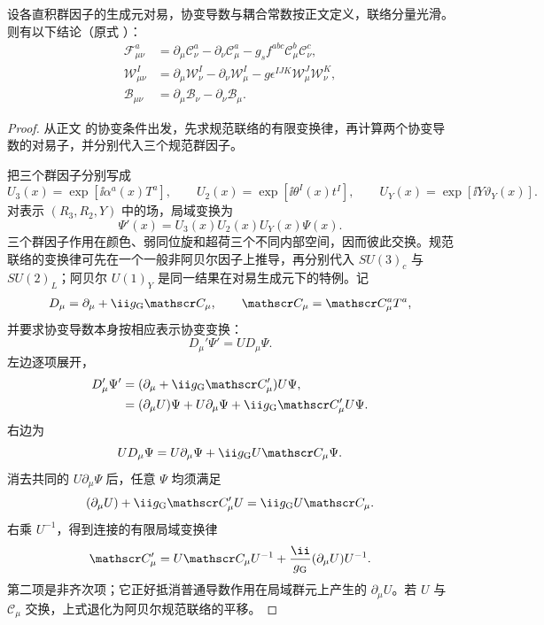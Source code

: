 \begin{proposition}[直积规范联络的曲率]
设各直积群因子的生成元对易，协变导数与耦合常数按正文定义，联络分量光滑。则有以下结论（原式 ）：
\begin{align*}
 \mathcal F_{\mu\nu}^a
 &=\partial_\mu\mathscr C_\nu^a-\partial_\nu\mathscr C_\mu^a
 -g_sf^{abc}\mathscr C_\mu^b\mathscr C_\nu^c,\\
 \mathcal W_{\mu\nu}^I
 &=\partial_\mu\mathcal W_\nu^I-\partial_\nu\mathcal W_\mu^I
 -g\epsilon^{IJK}\mathcal W_\mu^J\mathcal W_\nu^K,\\
 \mathcal B_{\mu\nu}
 &=\partial_\mu\mathcal B_\nu-\partial_\nu\mathcal B_\mu.
\end{align*}
\end{proposition}
\begin{proof}
从正文 的协变条件出发，先求规范联络的有限变换律，再计算两个协变导数的对易子，并分别代入三个规范群因子。

把三个群因子分别写成
\begin{equation*}
 U_3(x)=\exp[\ii\alpha^a(x)T^a],\qquad
 U_2(x)=\exp[\ii\theta^I(x)t^I],\qquad
 U_Y(x)=\exp[\ii Y\vartheta_Y(x)].
\end{equation*}
对表示 $(R_3,R_2,Y)$ 中的场，局域变换为
\begin{equation*}
 \Psi'(x)=U_3(x)U_2(x)U_Y(x)\Psi(x).
\end{equation*}
三个群因子作用在颜色、弱同位旋和超荷三个不同内部空间，因而彼此交换。规范联络的变换律可先在一个一般非阿贝尔因子上推导，再分别代入 $SU(3)_c$ 与 $SU(2)_L$；阿贝尔 $U(1)_Y$ 是同一结果在对易生成元下的特例。记
\begin{equation*}
 D_\mu=\partial_\mu+\ii g_{\rm G}\mathscr C_\mu,
 \qquad \mathscr C_\mu=\mathscr C_\mu^aT^a,
\end{equation*}
并要求协变导数本身按相应表示协变变换：
\begin{equation*}
 D_\mu'\Psi'=U D_\mu\Psi.
\end{equation*}
左边逐项展开，
\begin{align*}
 D_\mu'\Psi'
 &=(\partial_\mu+\ii g_{\rm G}\mathscr C_\mu')U\Psi,\\
 &=(\partial_\mu U)\Psi+U\partial_\mu\Psi
   +\ii g_{\rm G}\mathscr C_\mu'U\Psi.
\end{align*}
右边为
\begin{equation*}
 U D_\mu\Psi
 =U\partial_\mu\Psi+\ii g_{\rm G}U\mathscr C_\mu\Psi.
\end{equation*}
消去共同的 $U\partial_\mu\Psi$ 后，任意 $\Psi$ 均须满足
\begin{equation*}
 (\partial_\mu U)+\ii g_{\rm G}\mathscr C_\mu'U
 =\ii g_{\rm G}U\mathscr C_\mu.
\end{equation*}
右乘 $U^{-1}$，得到连接的有限局域变换律
\begin{equation*}
 {
 \mathscr C_\mu'
 =U\mathscr C_\mu U^{-1}
 +\frac{\ii}{g_{\rm G}}(\partial_\mu U)U^{-1}.}
\end{equation*}
第二项是非齐次项；它正好抵消普通导数作用在局域群元上产生的 $\partial_\mu U$。若 $U$ 与 $\mathscr C_\mu$ 交换，上式退化为阿贝尔规范联络的平移。


\end{proof}
